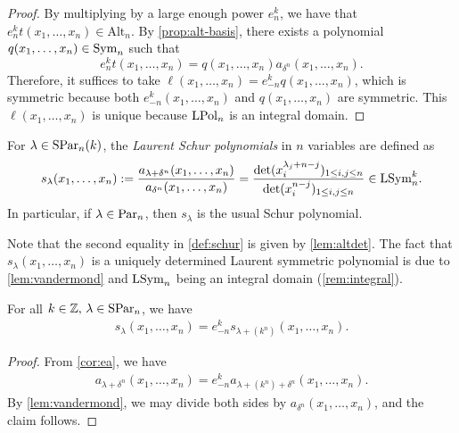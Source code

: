 \documentclass[11pt]{amsart}
\begin{document}
\begin{proof}
    By multiplying by a large enough power \(e_n^k\), we have that \(e_n^k t(x_1,\dots,x_n) \in \mathrm{Alt}_n\). By \cref{prop:alt-basis}, there exists a polynomial \(q(x_1,\dots,x_n) \in \mathrm{Sym}_n\) such that
    \[
    e_n^k t(x_1,\dots,x_n) = q(x_1,\dots,x_n) a_{\delta^n}(x_1,\dots,x_n).
    \]
    Therefore, it suffices to take \(\ell(x_1,\dots,x_n) = e_{-n}^k q(x_1,\dots,x_n)\), which is symmetric because both $e_{-n}^k(x_1,\dots,x_n)$ and $q(x_1,\dots,x_n)$ are symmetric. This $\ell(x_1, \dots, x_n)$ is unique because $\mathrm{LPol}_n$ is an integral domain. 
\end{proof}

\begin{defin}\label{def:schur}
    For $\lambda \in \mathrm{SPar}_n(k)$, the \emph{Laurent Schur polynomials} in $n$ variables are defined as
    \begin{align}
        s_\lambda(x_1, \ldots, x_n) := \dfrac{a_{\lambda + \delta^n}(x_1, \ldots, x_n)}{a_{\delta^n}(x_1, \ldots, x_n)} = \frac{\det(x_i^{\lambda_j + n - j})_{1\leq i,j\leq n}}{\det(x_i^{n - j})_{1\leq i,j\leq n}} \in \mathrm{LSym}_n^{k}. \label{eq:Laurent-Schur}
    \end{align}
    In particular, if $\lambda \in \mathrm{Par}_n$, then $s_\lambda$ is the usual Schur polynomial.
\end{defin}

\begin{rem}
    Note that the second equality in \cref{def:schur} is given by \cref{lem:altdet}. The fact that $s_\lambda(x_1, \dots, x_n)$ is a  uniquely determined Laurent symmetric polynomial is due to \cref{lem:vandermond} and \(\mathrm{LSym}_n\) being an integral domain (\cref{rem:integral}).
\end{rem}

\begin{prop} \label{prop:schuren}
    For all $k \in \mathbb{Z},\, \lambda \in  \mathrm{SPar}_n$, we have
    \begin{align}
        s_\lambda(x_1,\dots,x_n)  = e_{-n}^ks_{\lambda + (k^n)}(x_1,\dots,x_n). \label{eq:schuren}
    \end{align}
\end{prop}

\begin{proof}
From \cref{cor:ea}, we have 
\begin{align*}
    a_{\lambda + \delta^n}(x_1,\dots,x_n) = e_{-n}^ka_{\lambda + (k^n) + \delta^n}(x_1,\dots ,x_n).
\end{align*}
By \cref{lem:vandermond}, we may divide both sides by $a_{\delta^n}(x_1,\dots,x_n)$, and the claim follows.
\end{proof}
\end{document}
